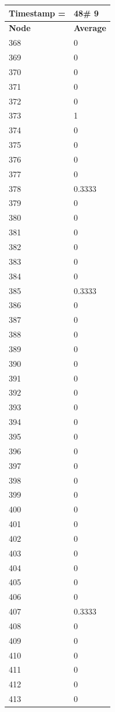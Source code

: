 \begin{tabular}{|l||l|}
\hline
\textbf{Timestamp =} & \textbf{48}\# 9\\\hline
	\textbf{Node} & \textbf{Average} \\ \hline
\hline
	368 & 0 \\ \hline
	369 & 0 \\ \hline
	370 & 0 \\ \hline
	371 & 0 \\ \hline
	372 & 0 \\ \hline
	373 & 1 \\ \hline
	374 & 0 \\ \hline
	375 & 0 \\ \hline
	376 & 0 \\ \hline
	377 & 0 \\ \hline
	378 & 0.3333 \\ \hline
	379 & 0 \\ \hline
	380 & 0 \\ \hline
	381 & 0 \\ \hline
	382 & 0 \\ \hline
	383 & 0 \\ \hline
	384 & 0 \\ \hline
	385 & 0.3333 \\ \hline
	386 & 0 \\ \hline
	387 & 0 \\ \hline
	388 & 0 \\ \hline
	389 & 0 \\ \hline
	390 & 0 \\ \hline
	391 & 0 \\ \hline
	392 & 0 \\ \hline
	393 & 0 \\ \hline
	394 & 0 \\ \hline
	395 & 0 \\ \hline
	396 & 0 \\ \hline
	397 & 0 \\ \hline
	398 & 0 \\ \hline
	399 & 0 \\ \hline
	400 & 0 \\ \hline
	401 & 0 \\ \hline
	402 & 0 \\ \hline
	403 & 0 \\ \hline
	404 & 0 \\ \hline
	405 & 0 \\ \hline
	406 & 0 \\ \hline
	407 & 0.3333 \\ \hline
	408 & 0 \\ \hline
	409 & 0 \\ \hline
	410 & 0 \\ \hline
	411 & 0 \\ \hline
	412 & 0 \\ \hline
	413 & 0 \\ \hline
\end{tabular}

